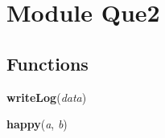 %
%
%


\section{Module Que2}

    \label{Que2}


  \subsection{Functions}

    \label{Que2:writeLog}

    \vspace{0.5ex}

\hspace{.8\funcindent}\begin{boxedminipage}{\funcwidth}

    \raggedright \textbf{writeLog}(\textit{data})

\setlength{\parskip}{2ex}
\setlength{\parskip}{1ex}
    \end{boxedminipage}

    \label{Que2:happy}

    \vspace{0.5ex}

\hspace{.8\funcindent}\begin{boxedminipage}{\funcwidth}

    \raggedright \textbf{happy}(\textit{a}, \textit{b})

\setlength{\parskip}{2ex}
\setlength{\parskip}{1ex}
    \end{boxedminipage}

    \label{Que2:compatible}

